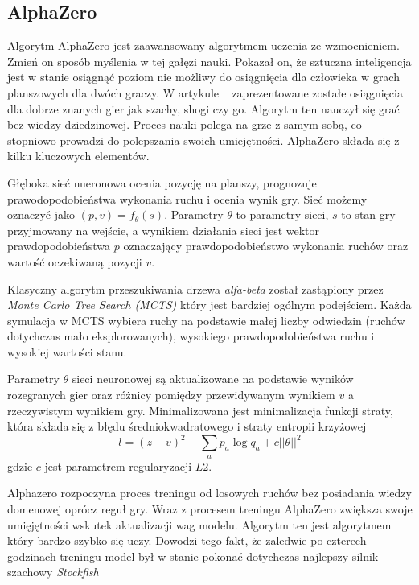 \subsection*{AlphaZero}
Algorytm AlphaZero jest zaawansowany algorytmem uczenia ze wzmocnieniem. Zmień on sposób myślenia 
w tej gałęzi nauki. Pokazał on, że sztuczna inteligencja jest w stanie osiągnąć poziom nie możliwy do 
osiągnięcia dla człowieka w grach planszowych dla dwóch graczy. W artykule ~\cite{alpha_zero} zaprezentowane
zostałe osiągnięcia dla dobrze znanych gier jak szachy, shogi czy go. Algorytm ten nauczył się grać bez 
wiedzy dziedzinowej. Proces nauki polega na grze z samym sobą, co stopniowo prowadzi do polepszania 
swoich umiejętności. AlphaZero składa się z kilku kluczowych elementów.

Głęboka sieć nueronowa ocenia pozycję na planszy, prognozuje prawodopodobieństwa wykonania ruchu i ocenia wynik gry.
Sieć możemy oznaczyć jako $(p,v)=f_{\theta}(s)$. Parametry $\theta$ to parametry sieci, $s$ to stan gry przyjmowany na wejście,
a wynikiem działania sieci jest wektor prawdopodobieństwa $p$ oznaczający prawdopodobieństwo wykonania ruchów oraz 
wartość oczekiwaną pozycji $v$.

Klasyczny algorytm przeszukiwania drzewa \textit{alfa-beta} został zastąpiony przez \textit{Monte Carlo Tree Search (MCTS)}
który jest bardziej ogólnym podejściem. Każda symulacja w MCTS wybiera ruchy na podstawie małej liczby odwiedzin (ruchów dotychczas mało eksplorowanych),
 wysokiego prawdopodobieństwa ruchu i wysokiej wartości stanu.

 Parametry $\theta$ sieci neuronowej są aktualizowane na podstawie wyników rozegranych gier oraz różnicy pomiędzy 
 przewidywanym wynikiem $v$ a rzeczywistym wynikiem gry. Minimalizowana jest minimalizacja funkcji straty, która składa 
 się z błędu średniokwadratowego i straty entropii krzyżowej 
 \begin{equation*}
    l = (z-v)^{2} - \sum_{a} p_{a} \log{q_{a} + c ||\theta||^{2}}
 \end{equation*}
 gdzie $c$ jest parametrem regularyzacji $L2$.

 Alphazero rozpoczyna proces treningu od losowych ruchów bez posiadania wiedzy domenowej oprócz reguł gry. Wraz z procesem 
 treningu AlphaZero zwiększa swoje umięjętności wskutek aktualizacji wag modelu. Algorytm ten jest algorytmem który bardzo szybko 
 się uczy. Dowodzi tego fakt, że zaledwie po czterech godzinach treningu model był w stanie pokonać dotychczas najlepszy 
 silnik szachowy \textit{Stockfish}